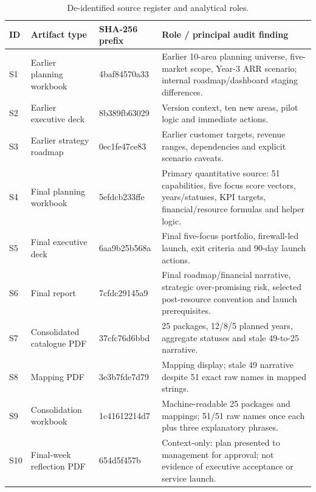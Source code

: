 \small
\begin{longtable}{p{0.55cm} p{2.2cm} p{2.1cm} p{7.1cm}}
\caption{De-identified source register and analytical roles.}\label{tab:app-source-register}\\
\toprule
ID & Artifact type & SHA-256 prefix & Role / principal audit finding \\
\midrule
\endhead
S1 & Earlier planning workbook & 4baf84570a33 & Earlier 10-area planning universe, five-market scope, Year-3 ARR scenario; internal roadmap/dashboard staging differences. \\
S2 & Earlier executive deck & 8b389fb63029 & Version context, ten new areas, pilot logic and immediate actions. \\
S3 & Earlier strategy roadmap & 0ec1fe47ce83 & Earlier customer targets, revenue ranges, dependencies and explicit scenario caveats. \\
S4 & Final planning workbook & 5efdcb233ffe & Primary quantitative source: 51 capabilities, five focus score vectors, years/statuses, KPI targets, financial/resource formulas and helper logic. \\
S5 & Final executive deck & 6aa9b25b568a & Final five-focus portfolio, firewall-led launch, exit criteria and 90-day launch actions. \\
S6 & Final report & 7cfdc29145a9 & Final roadmap/financial narrative, strategic over-promising risk, selected post-resource convention and launch prerequisites. \\
S7 & Consolidated catalogue PDF & 37cfc76d6bbd & 25 packages, 12/8/5 planned years, aggregate statuses and stale 49-to-25 narrative. \\
S8 & Mapping PDF & 3e3b7fde7d79 & Mapping display; stale 49 narrative despite 51 exact raw names in mapped strings. \\
S9 & Consolidation workbook & 1c41612214d7 & Machine-readable 25 packages and mappings; 51/51 raw names once each plus three explanatory phrases. \\
S10 & Final-week reflection PDF & 654d5f457b & Context-only: plan presented to management for approval; not evidence of executive acceptance or service launch. \\
\bottomrule
\end{longtable}
\small

